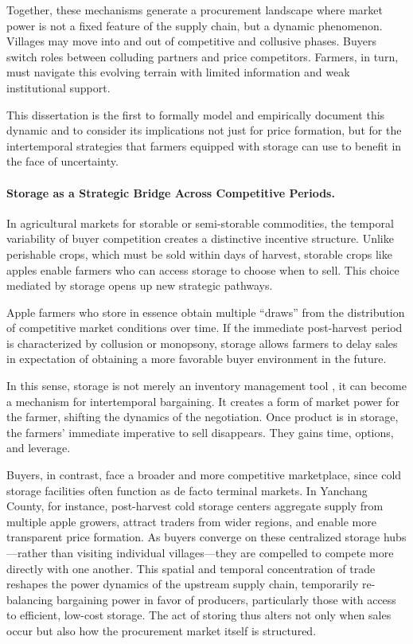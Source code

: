 \noindent
Together, these mechanisms generate a procurement landscape where market power is not a fixed feature of the supply chain, but a dynamic phenomenon. Villages may move into and out of competitive and collusive phases. Buyers switch roles between colluding partners and price competitors. Farmers, in turn, must navigate this evolving terrain with limited information and weak institutional support.

This dissertation is the first to formally model and empirically document this dynamic and to consider its implications not just for price formation, but for the intertemporal strategies that farmers equipped with storage can use to benefit in the face of uncertainty.


\paragraph{Storage as a Strategic Bridge Across Competitive Periods.}
In agricultural markets for storable or semi-storable commodities, the temporal variability of buyer competition creates a distinctive incentive structure. Unlike perishable crops, which must be sold within days of harvest, storable crops like apples enable farmers who can access storage to choose when to sell. This choice mediated by storage opens up new strategic pathways.

Apple farmers who store in essence obtain multiple ``draws'' from the distribution of competitive market conditions over time. If the immediate post-harvest period is characterized by collusion or monopsony, storage allows farmers to delay sales in expectation of obtaining a more favorable buyer environment in the future.

In this sense, storage is not merely an inventory management tool \citep{goyal2010information}, it can become a mechanism for intertemporal bargaining. It creates a form of market power for the farmer, shifting the dynamics of the negotiation. Once product is in storage, the farmers' immediate imperative to sell disappears. They gains time, options, and leverage. 

Buyers, in contrast, face a broader and more competitive marketplace, since cold storage facilities often function as de facto terminal markets. In Yanchang County, for instance, post-harvest cold storage centers aggregate supply from multiple apple growers, attract traders from wider regions, and enable more transparent price formation. As buyers converge on these centralized storage hubs---rather than visiting individual villages---they are compelled to compete more directly with one another. This spatial and temporal concentration of trade reshapes the power dynamics of the upstream supply chain, temporarily re-balancing bargaining power in favor of producers, particularly those with access to efficient, low-cost storage. The act of storing thus alters not only when sales occur but also how the procurement market itself is structured.


